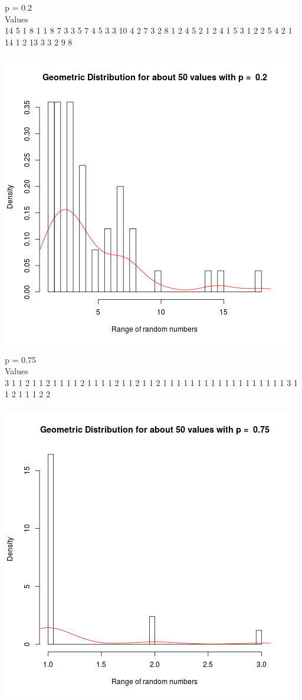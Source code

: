 \documentclass{article}
\begin{document}
p = 0.2\\
Values\\
14  5  1  8  1  1  8  7  3  3  5  7  4  5  3  3 10  4  2  7  3  2  8  1  2 
 4  5  2  1  2  4  1  5  3  1  2  2  5  4  2  1 14  1  2 13  3  3  2  9  8\\\\
\includegraphics{"plot1_2"}
\pagebreak

p = 0.75\\
Values\\
3 1 1 2 1 1 2 1 1 1 1 2 1 1 1 1 2 1 1 2 1 1 2 1 1 1 1 1 1 1 1 1 1 1 1 1 1 1 
1 1 1 3 1 1 2 1 1 1 2 2\\\\
\includegraphics{"plot1_3"}
\pagebreak
\end{document}
